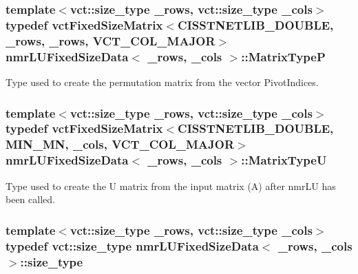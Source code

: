 \subsubsection[{Matrix\+Type\+P}]{\setlength{\rightskip}{0pt plus 5cm}template$<$vct\+::size\+\_\+type \+\_\+rows, vct\+::size\+\_\+type \+\_\+cols$>$ typedef {\bf vct\+Fixed\+Size\+Matrix}$<$C\+I\+S\+S\+T\+N\+E\+T\+L\+I\+B\+\_\+\+D\+O\+U\+B\+L\+E, \+\_\+rows, \+\_\+rows, {\bf V\+C\+T\+\_\+\+C\+O\+L\+\_\+\+M\+A\+J\+O\+R}$>$ {\bf nmr\+L\+U\+Fixed\+Size\+Data}$<$ \+\_\+rows, \+\_\+cols $>$\+::{\bf Matrix\+Type\+P}}\label{classnmr_l_u_fixed_size_data_aba187a86e2a881d8327e56bdbc87b159}
Type used to create the permutation matrix from the vector Pivot\+Indices. \hypertarget{classnmr_l_u_fixed_size_data_af66a67d9ec3e76d9d63dc36cfd969896}{}
\subsubsection[{Matrix\+Type\+U}]{\setlength{\rightskip}{0pt plus 5cm}template$<$vct\+::size\+\_\+type \+\_\+rows, vct\+::size\+\_\+type \+\_\+cols$>$ typedef {\bf vct\+Fixed\+Size\+Matrix}$<$C\+I\+S\+S\+T\+N\+E\+T\+L\+I\+B\+\_\+\+D\+O\+U\+B\+L\+E, {\bf M\+I\+N\+\_\+\+M\+N}, \+\_\+cols, {\bf V\+C\+T\+\_\+\+C\+O\+L\+\_\+\+M\+A\+J\+O\+R}$>$ {\bf nmr\+L\+U\+Fixed\+Size\+Data}$<$ \+\_\+rows, \+\_\+cols $>$\+::{\bf Matrix\+Type\+U}}\label{classnmr_l_u_fixed_size_data_af66a67d9ec3e76d9d63dc36cfd969896}
Type used to create the U matrix from the input matrix (A) after nmr\+L\+U has been called. \hypertarget{classnmr_l_u_fixed_size_data_a082f0e46bc61303a725f08a300ff4276}{}
\subsubsection[{size\+\_\+type}]{\setlength{\rightskip}{0pt plus 5cm}template$<$vct\+::size\+\_\+type \+\_\+rows, vct\+::size\+\_\+type \+\_\+cols$>$ typedef {\bf vct\+::size\+\_\+type} {\bf nmr\+L\+U\+Fixed\+Size\+Data}$<$ \+\_\+rows, \+\_\+cols $>$\+::{\bf size\+\_\+type}}\label{classnmr_l_u_fixed_size_data_a082f0e46bc61303a725f08a300ff4276}
\hypertarget{classnmr_l_u_fixed_size_data_aa44bd56146e161d7b56d7f2001153ccb}{}
